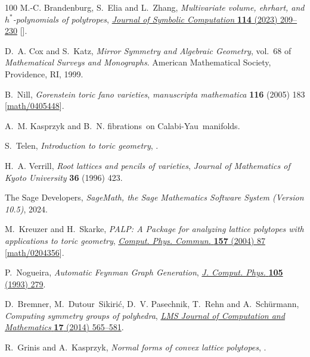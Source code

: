 \documentclass[12pt,a4paper]{article}
\theoremstyle{plain}
\theoremstyle{remark}
\begin{document}
\begin{thebibliography}{100}
M.-C. Brandenburg, S.~Elia and L.~Zhang, \emph{Multivariate volume, ehrhart,
  and $h^*$-polynomials of polytropes},
  \href{https://doi.org/10.1016/j.jsc.2022.04.011}{\emph{Journal of Symbolic
  Computation} {\bfseries 114} (2023) 209–230}
  [\href{https://arxiv.org/abs/2006.01920}{{}}].

D.~A. Cox and S.~Katz, \emph{Mirror Symmetry and Algebraic Geometry}, vol.~68
  of \emph{Mathematical Surveys and Monographs}. American Mathematical Society,
  Providence, RI, 1999.

B.~Nill, \emph{Gorenstein toric fano varieties}, {\emph{manuscripta
  mathematica} {\bfseries 116} (2005) 183}
  [\href{https://arxiv.org/abs/math/0405448}{{\ttfamily math/0405448}}].

A.~M. Kasprzyk and B.~N. fibrations~on Calabi-Yau~manifolds.

S.~Telen, \emph{Introduction to toric geometry},
  \href{https://arxiv.org/abs/2203.01690}{{}}.

H.~A. Verrill, \emph{Root lattices and pencils of varieties}, {\emph{Journal of
  Mathematics of Kyoto University} {\bfseries 36} (1996) 423}.

{The Sage Developers}, \emph{{S}ageMath, the {S}age {M}athematics {S}oftware
  {S}ystem ({V}ersion 10.5)}, 2024.

M.~Kreuzer and H.~Skarke, \emph{{PALP: A Package for analyzing lattice
  polytopes with applications to toric geometry}},
  \href{https://doi.org/10.1016/S0010-4655(03)00491-0}{\emph{Comput. Phys.
  Commun.} {\bfseries 157} (2004) 87}
  [\href{https://arxiv.org/abs/math/0204356}{{\ttfamily math/0204356}}].

P.~Nogueira, \emph{{Automatic Feynman Graph Generation}},
  \href{https://doi.org/10.1006/jcph.1993.1074}{\emph{J. Comput. Phys.}
  {\bfseries 105} (1993) 279}.

D.~Bremner, M.~Dutour~Sikirić, D.~V. Pasechnik, T.~Rehn and A.~Schürmann,
  \emph{Computing symmetry groups of polyhedra},
  \href{https://doi.org/10.1112/s1461157014000400}{\emph{LMS Journal of
  Computation and Mathematics} {\bfseries 17} (2014) 565–581}.

R.~Grinis and A.~Kasprzyk, \emph{Normal forms of convex lattice polytopes},
  \href{https://arxiv.org/abs/1301.6641}{{}}.


\end{thebibliography}
\end{document}
